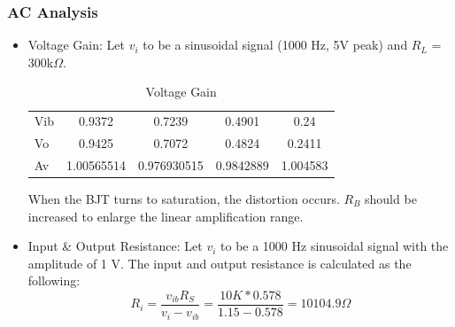 \subsubsection{AC Analysis}
\begin{itemize}
    \item Voltage Gain: Let $v_i$ to be a sinusoidal signal (1000 Hz, 5V peak) and $R_L$ = 300k$\Omega$.
        \begin{table}[h]
        \centering
        \begin{tabular}{l|cccc}
            \toprule
            Vib & 0.9372     & 0.7239      & 0.4901    & 0.24     \\ 
            Vo  & 0.9425     & 0.7072      & 0.4824    & 0.2411   \\
            \midrule
            Av  & 1.00565514 & 0.976930515 & 0.9842889 & 1.004583 \\ 
            \bottomrule
        \end{tabular}
        \caption{Voltage Gain}
        \end{table}
        \FloatBarrier
        When the BJT turns to saturation, the distortion occurs. $R_B$ should be increased to enlarge the linear amplification range.
    \item Input \& Output Resistance: Let $v_i$ to be  a 1000 Hz sinusoidal signal with the amplitude of 1 V.
        The input and output resistance is calculated as the following:
        \begin{equation}
            R_i = \frac{v_{ib} R_S}{v_i-v_{ib}} = \frac{10K * 0.578}{1.15 - 0.578} = 10104.9\Omega
        \end{equation}

        
\end{itemize}


